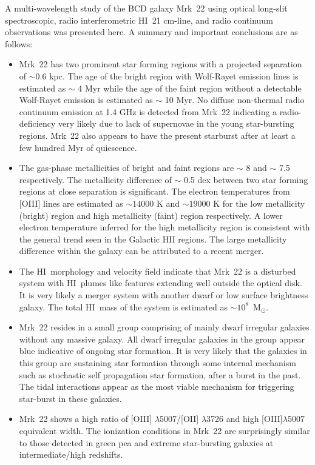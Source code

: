\documentclass[useAMS,usenatbib]{mn2e}
\def\HI{H{\small{I}}~}
\begin{document}
A multi-wavelength study of the BCD galaxy Mrk~22 using optical long-slit spectroscopic, radio interferometric \HI 21 cm-line, and radio continuum observations was presented here. A summary and important conclusions are as follows:

\begin{itemize}

\item {Mrk~22 has two prominent star forming regions with a projected separation of $\sim0.6$ kpc. The age of the bright region with Wolf-Rayet emission lines is estimated as $\sim$ 4 Myr while the age of the faint region without a detectable Wolf-Rayet emission is estimated as $\sim$ 10 Myr. No diffuse non-thermal radio continuum emission at 1.4 GHz is detected from Mrk~22 indicating a radio-deficiency very likely due to lack of supernovae in the young star-bursting regions. Mrk~22 also appears to have the present starburst after at least a few hundred Myr of quiescence.}

\item {The gas-phase metallicities of bright and faint regions are $\sim$ 8 and $\sim$ 7.5 respectively. The metallicity difference of $\sim$ 0.5 dex between two star forming regions at close separation is significant. The electron temperatures from [O{\small{III}}] lines are estimated as $\sim14000$ K and $\sim19000$ K for the low metallicity (bright) region and high metallicity (faint) region respectively. A lower electron temperature inferred for the high metallicity region is consistent with the general trend seen in the Galactic H{\small{II}} regions. The large metallicity difference within the galaxy can be attributed to a recent merger.}

\item {The \HI morphology and velocity field indicate that Mrk~22 is a disturbed system with \HI plumes like features extending well outside the optical disk. It is very likely a merger system with another dwarf or low surface brightness galaxy. The total \HI mass of the system is estimated as $\sim10^{8}$~M$_{\odot}$.}

\item {Mrk~22 resides in a small group comprising of mainly dwarf irregular galaxies without any massive galaxy. All dwarf irregular galaxies in the group appear blue indicative of ongoing star formation. It is very likely that the galaxies in this group are sustaining star formation through some internal mechanism such as stochastic self propagation star formation, after a burst in the past. The tidal interactions appear as the most viable mechanism for triggering star-burst in these galaxies.}

\item {Mrk~22 shows a high ratio of [O{\small{III}}] $\lambda$5007/[O{\small{II}}] $\lambda$3726 and high [O{\small{III}}]$\lambda$5007 equivalent width. The ionization conditions in Mrk~22 are surprisingly similar to those detected in green pea and extreme star-bursting galaxies at intermediate/high redshifts.}

\end{itemize}
  
\end{document}
